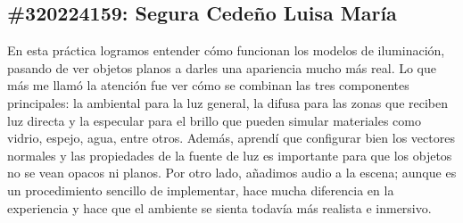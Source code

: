 \subsection*{\#320224159: Segura Cedeño Luisa María}
En esta práctica logramos entender cómo funcionan los modelos de iluminación, pasando de ver objetos planos a darles una apariencia mucho más real. Lo que más me llamó la atención fue ver cómo se combinan las tres componentes principales: la ambiental para la luz general, la difusa para las zonas que reciben luz directa y la especular para el brillo que pueden simular materiales como vidrio, espejo, agua, entre otros. Además, aprendí que configurar bien los vectores normales y las propiedades de la fuente de luz es importante para que los objetos no se vean opacos ni planos. Por otro lado, añadimos audio a la escena; aunque es un procedimiento sencillo de implementar, hace mucha diferencia en la experiencia y hace que el ambiente se sienta todavía más realista e inmersivo.

